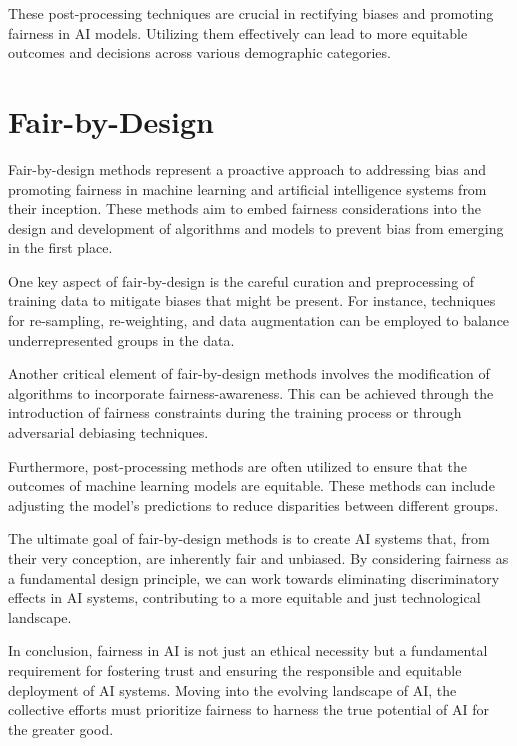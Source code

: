 \documentclass[12pt,a4paper,openright,twoside]{book}
\begin{document}
These post-processing techniques are crucial in rectifying biases and promoting fairness in AI models. Utilizing them effectively can lead to more equitable outcomes and decisions across various demographic categories.
\newpage
\section{Fair-by-Design}
Fair-by-design methods represent a proactive approach to addressing bias and promoting fairness in machine learning and artificial intelligence systems from their inception. These methods aim to embed fairness considerations into the design and development of algorithms and models to prevent bias from emerging in the first place. 

One key aspect of fair-by-design is the careful curation and preprocessing of training data to mitigate biases that might be present. For instance, techniques for re-sampling, re-weighting, and data augmentation can be employed to balance underrepresented groups in the data. 

Another critical element of fair-by-design methods involves the modification of algorithms to incorporate fairness-awareness. This can be achieved through the introduction of fairness constraints during the training process or through adversarial debiasing techniques. 

Furthermore, post-processing methods are often utilized to ensure that the outcomes of machine learning models are equitable. These methods can include adjusting the model's predictions to reduce disparities between different groups. 

The ultimate goal of fair-by-design methods is to create AI systems that, from their very conception, are inherently fair and unbiased. By considering fairness as a fundamental design principle, we can work towards eliminating discriminatory effects in AI systems, contributing to a more equitable and just technological landscape. 



In conclusion, fairness in AI is not just an ethical necessity but a fundamental requirement for fostering trust and ensuring the responsible and equitable deployment of AI systems. Moving into the evolving landscape of AI, the collective efforts must prioritize fairness to harness the true potential of AI for the greater good.

%
\end{document}

